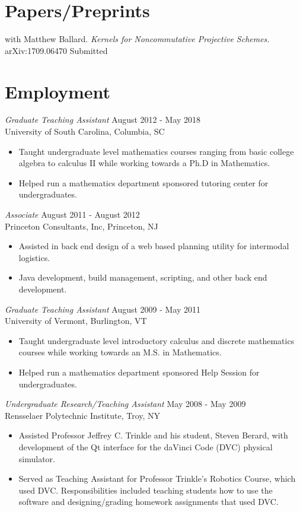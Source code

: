 \documentclass{article}
\begin{document}
  \section*{Papers/Preprints}
  with Matthew Ballard.  \textsl{Kernels for Noncommutative Projective Schemes.} 
  arXiv:1709.06470 \hfill Submitted
  
  \section*{Employment}
  \textsl{Graduate Teaching Assistant} \hfill August 2012 - May 2018 \\
  University of South Carolina, Columbia, SC
  \begin{itemize}  \itemsep -2pt %
  \item
    Taught undergraduate level mathematics courses ranging from basic college algebra to calculus II while working towards a Ph.D in Mathematics.
  \item 
    Helped run a mathematics department sponsored tutoring center for undergraduates.
  \end{itemize}

  \noindent\textsl{Associate} \hfill August 2011 - August 2012\\
  Princeton Consultants, Inc, Princeton, NJ
  \begin{itemize}\itemsep -2pt
  \item
    Assisted in back end design of a web based planning utility for intermodal logistics.
  \item
    Java development, build management, scripting, and other back end development.
  \end{itemize}
  
  \noindent\textsl{Graduate Teaching Assistant} \hfill August 2009 - May 2011 \\
  University of Vermont, Burlington, VT
  \begin{itemize}  \itemsep -2pt %
  \item
    Taught undergraduate level introductory calculus and discrete mathematics courses while working towards an M.S. in Mathematics.
  \item 
    Helped run a mathematics department sponsored Help Session for undergraduates.
  \end{itemize}

  \noindent\textsl{Undergraduate Research/Teaching Assistant} \hfill May 2008 - May 2009 \\
  Rensselaer Polytechnic Institute, Troy, NY
  \begin{itemize}  \itemsep -2pt %
  \item Assisted Professor Jeffrey C. Trinkle and his student, Steven Berard, with development of the Qt interface for the daVinci Code (DVC) physical simulator.
  \item Served as Teaching Assistant for Professor Trinkle's Robotics Course, which used DVC.
    Responsibilities included teaching students how to use the software and designing/grading homework assignments that used DVC.
  \end{itemize}
\end{document}
